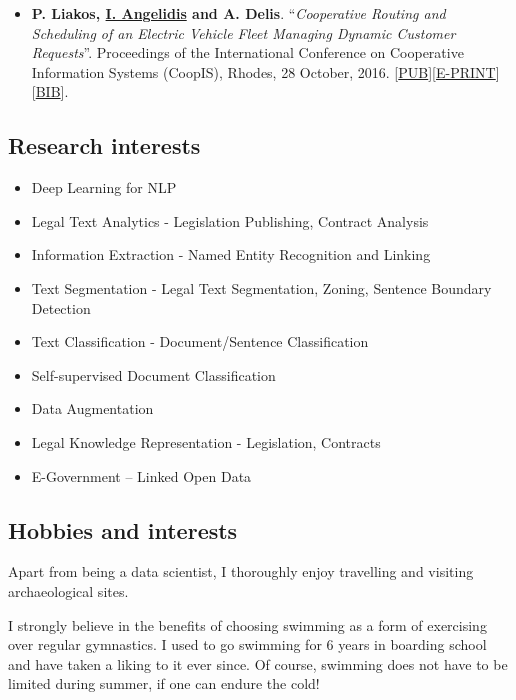 \documentclass[a4paper,oneside,11pt]{article}
\begin{document}
\begin{itemize}
\item \textbf{P. Liakos, \underline{I. Angelidis} and A. Delis}. ``\textit{Cooperative Routing and Scheduling of an Electric Vehicle Fleet Managing Dynamic Customer Requests}''. Proceedings of the International Conference on Cooperative Information Systems (CoopIS), Rhodes, 28 October, 2016. [\href{https://link.springer.com/chapter/10.1007%2F978-3-319-48472-3_7}{PUB}][\href{https://iosang.github.io/documents/Publications/2016/LAD-Coopis16.pdf}{E-PRINT}][\href{https://dblp.uni-trier.de/rec/bib1/conf/otm/LiakosAD16.bib}{BIB}].

\end{itemize}

\subsection*{Research interests}

\begin{itemize}

\item Deep Learning for NLP
\item Legal Text Analytics - Legislation Publishing, Contract Analysis
\item Information Extraction - Named Entity Recognition and Linking
\item Text Segmentation - Legal Text Segmentation, Zoning, Sentence Boundary Detection
\item Text Classification - Document/Sentence Classification
\item Self-supervised Document Classification
\item Data Augmentation
\item Legal Knowledge Representation - Legislation, Contracts
\item E-Government – Linked Open Data

\end{itemize}

\subsection*{Hobbies and interests}

Apart from being a data scientist, I thoroughly enjoy travelling and visiting archaeological sites.

I strongly believe in the benefits of choosing swimming as a form of exercising over regular gymnastics. I used to go swimming for 6 years in boarding school and have taken a liking to it ever since. Of course, swimming does not have to be limited during summer, if one can endure the cold!
\end{document}
